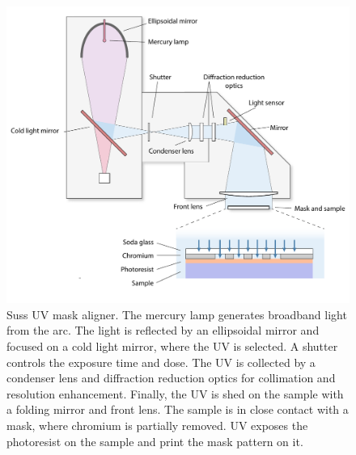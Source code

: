 \documentclass[pdflatex, sectionletters, 12pt, final, phd]{pittetd}    %
\begin{document}
\begin{figure}[hp!]
	\centering
	\includegraphics[width=1.0\textwidth]{Drawing/Suss.pdf}
	\caption[Suss UV mask aligner]{Suss UV mask aligner. The mercury lamp generates broadband light from the arc. The light is reflected by an ellipsoidal mirror and focused on a cold light mirror, where the UV is selected. A shutter controls the exposure time and dose. The UV is collected by a condenser lens and diffraction reduction optics for collimation and resolution enhancement. Finally, the UV is shed on the sample with a folding mirror and front lens. The sample is in close contact with a mask, where chromium is partially removed. UV exposes the photoresist on the sample and print the mask pattern on it.}
	\label{FIG:Suss}
\end{figure}
\end{document}
